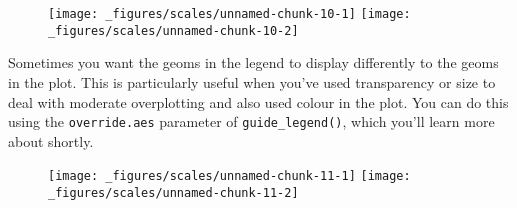 \begin{figure}[H]
  \texttt{[image: \_figures/scales/unnamed-chunk-10-1]}%
  \texttt{[image: \_figures/scales/unnamed-chunk-10-2]}
\end{figure}

Sometimes you want the geoms in the legend to display differently to the
geoms in the plot. This is particularly useful when you've used
transparency or size to deal with moderate overplotting and also used
colour in the plot. You can do this using the \texttt{override.aes}
parameter of \texttt{guide\_legend()}, which you'll learn more about
shortly. 

\begin{Shaded}
\begin{Highlighting}[]
\StringTok{ }\NormalTok{(} \NormalTok{(}\NormalTok{), } \NormalTok{(}\NormalTok{))}
\OperatorTok{$}\StringTok{ }\OperatorTok{$}\NormalTok{, } \NormalTok{(}\NormalTok{, }\NormalTok{, }\NormalTok{))}
\OperatorTok{+}\StringTok{ }
\StringTok{  }\NormalTok{(}\NormalTok{(} \NormalTok{)}
\OperatorTok{+}\StringTok{ }
\StringTok{  }\NormalTok{(}\NormalTok{(} \NormalTok{) }\OperatorTok{+}\StringTok{ }
\StringTok{  }\NormalTok{(} \NormalTok{(} \NormalTok{(} \NormalTok{)))}
\end{Highlighting}
\end{Shaded}

\begin{figure}[H]
  \texttt{[image: \_figures/scales/unnamed-chunk-11-1]}%
  \texttt{[image: \_figures/scales/unnamed-chunk-11-2]}
\end{figure}

